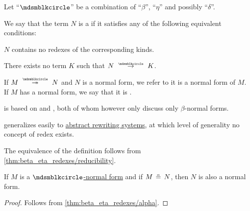 \begin{definition}\label{def:lambda_term_normal_form}\mimprovised
  Let \enquote{\( {\Anon} \)} be a combination of \enquote{\( \beta \)}, \enquote{\( \eta \)} and possibly \enquote{\( \delta \)}.

  We say that the term \( N \) is a  if it satisfies any of the following equivalent conditions:
  \begin{thmenum}
     \( N \) contains no redexes of the corresponding kinds.

     There exists no term \( K \) such that \( N \pred K \).
  \end{thmenum}

  If \( M \pred* N \) and \( N \) is a normal form, we refer to it is a normal form of \( M \). If \( M \) has a normal form, we say that it is .
\end{definition}
\begin{comments}
  \item {} is based on  and , both of whom however only discuss only \( \beta \)-normal forms.

  \item {} generalizes easily to \hyperref[def:rewriting_system]{abstract rewriting systems}, at which level of generality no concept of redex exists.
\end{comments}
\begin{defproof}
  The equivalence of the definition follows from \cref{thm:beta_eta_redexes/reducibility}.
\end{defproof}

\begin{proposition}\label{thm:alpha_equivalent_normal_form}
  If \( M \) is a \hyperref[def:lambda_term_normal_form]{\( \Anon \)-normal form} and if \( M \aequiv N \), then \( N \) is also a normal form.
\end{proposition}
\begin{proof}
  Follows from \cref{thm:beta_eta_redexes/alpha}.
\end{proof}

